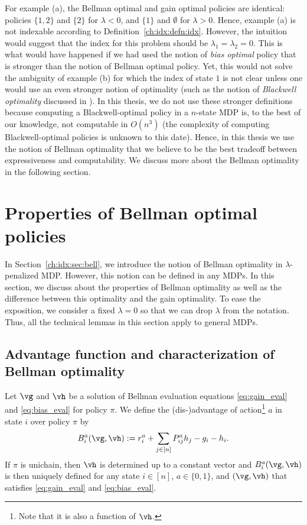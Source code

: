 For example (a), the Bellman optimal and gain optimal policies are identical: policies $\{1,2\}$ and $\{2\}$ for $\lambda<0$, and $\{1\}$ and $\emptyset$ for $\lambda>0$.
Hence, example (a) is not indexable according to Definition~\ref{ch:idx:defn:idx}.
However, the intuition would suggest that the index for this problem should be $\lambda_1=\lambda_2=0$. This is what would have happened if we had used the notion of \emph{bias optimal} policy that is stronger than the notion of Bellman optimal policy. Yet, this would not solve the ambiguity of example (b) for which the index of state $1$ is not clear unless one would use an even  stronger notion of optimality (such as the notion of \emph{Blackwell optimality} discussed in \cite[Chapter~10]{puterman2014markov}). In this thesis, we do not use these stronger definitions because computing a Blackwell-optimal policy in a $n$-state MDP is, to the best of our knowledge, not computable in $O(n^3)$ (the complexity of computing Blackwell-optimal policies is unknown to this date). Hence, in this thesis we use the notion of Bellman optimality that we believe to be the best tradeoff between expressiveness and computability. We discuss more about the Bellman optimality in the following section.

\section{Properties of Bellman optimal policies}
\label{ch:idx:sec:prop_bell}

In Section~\ref{ch:idx:sec:bell}, we introduce the notion of Bellman optimality in $\lambda$-penalized MDP.
However, this notion can be defined in any MDPs.
In this section, we discuss about the properties of Bellman optimality as well as the difference between this optimality and the gain optimality.
To ease the exposition, we consider a fixed $\lambda=0$ so that we can drop $\lambda$ from the notation.
Thus, all the technical lemmas in this section apply to general MDPs.

\subsection{Advantage function and characterization of Bellman optimality}

Let $\vg$ and $\vh$ be a solution of Bellman evaluation equations \eqref{eq:gain_eval} and \eqref{eq:bias_eval} for policy $\pi$.
We define the (dis-)advantage of action\footnote{Note that it is also a function of $\vh$.} $a$ in state $i$ over policy $\pi$ by
\begin{equation}
    \label{ch:idx:eq:advan}
    B^a_i(\vg,\vh) := r^a_i +\sum_{j\in[n]}P^a_{ij}h_j -g_i -h_i.
\end{equation}
If $\pi$ is unichain, then $\vh$ is determined up to a constant vector and $B^a_i(\vg,\vh)$ is then uniquely defined for any state $i\in[n]$, $a\in\{0,1\}$, and $(\vg,\vh)$ that satisfies \eqref{eq:gain_eval} and \eqref{eq:bias_eval}.

